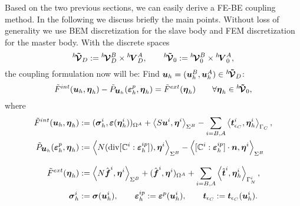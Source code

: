 \documentclass[12pt,a4paper]{scrbook}
\begin{document}
Based on the two previous sections, we can easily derive a  FE-BE coupling method. In the following we discuss briefly the main points. Without loss of generality we use BEM discretization for the slave body and FEM discretization for the master body. With the  discrete spaces
\[
{}^h\!\mbox{\boldmath$\tilde {\mathcal V}$}_D := {}^h\!\mbox{\boldmath$\mathcal V$}^{B}_D \times {}^h\!\mbox{\boldmath$V$}^{A}_D, \qquad {}^h\!\mbox{\boldmath$\tilde {\mathcal V}$}_0 := {}^h\!\mbox{\boldmath$\mathcal V$}^{B}_0 \times {}^h\!\mbox{\boldmath$V$}^{A}_0,
\]
the coupling formulation now will be: Find $\mbox{\boldmath$u$}_{h} = (\mbox{\boldmath$u$}^{B}_h,\mbox{\boldmath$u$}^{A}_h) \in {}^h\!\mbox{\boldmath$\tilde {\mathcal V}$}_D$:
\begin{equation}  \label{WeakFormF_FEMBEM}
\tilde F^{int}(\mbox{\boldmath$u$}_{h},\mbox{\boldmath$\eta$}_h) - \tilde P_{\mbox{\boldmath$u$}_{h}} ( \mbox{\boldmath$\varepsilon$}_{h}^p,\mbox{\boldmath$\eta$}_h) = \tilde F^{ext}(\mbox{\boldmath$\eta$}_h) \qquad \forall \mbox{\boldmath$\eta$}_h \in {}^h\!\mbox{\boldmath$\tilde {\mathcal V}$}_0,
\end{equation}
where
\begin{align*}
\tilde F^{int}(\mbox{\boldmath$u$}_{h},\mbox{\boldmath$\eta$}_h) &:= 
(\mbox{\boldmath$\sigma$}_{h}^i,\mbox{\boldmath$\varepsilon$}(\mbox{\boldmath$\eta$}^i_h))_{\Omega^{A}} 
+ \left\langle S \mbox{\boldmath$u$}^i, \mbox{\boldmath$\eta$}^i \right\rangle_{\Sigma^{B}} 
- \sum_{i=B,A} \left\langle \mbox{\boldmath$t$}_{\epsilon_C}^i, \mbox{\boldmath$\eta$}^i_h\right\rangle_{\Gamma_C}, \\
\tilde P_{\mbox{\boldmath$u$}_{h}} ( \mbox{\boldmath$\varepsilon$}_{h}^p,\mbox{\boldmath$\eta$}_h) &:= 
 \left\langle  N (\mathop{\rm div}\nolimits[{\mathbb C}^i : \mbox{\boldmath$\varepsilon$}_{h}^{ip}]), \mbox{\boldmath$\eta$}^i \right\rangle_{\Sigma^{B}}
- \left\langle [{\mathbb C}^i : \mbox{\boldmath$\varepsilon$}_{h}^{ip}] \cdot \mbox{\boldmath$n$}, \mbox{\boldmath$\eta$}^i\right\rangle_{\Sigma^{B}} \\[2ex]
\tilde F^{ext}(\mbox{\boldmath$\eta$}_h) &:= 
\left\langle N \hat{\mbox{\boldmath$f$}}^i, \mbox{\boldmath$\eta$}^i \right\rangle_{\Sigma^{B}}
+ ( \hat{\mbox{\boldmath$f$}}^i, \mbox{\boldmath$\eta$}^i)_{\Omega^{A}}
+ \sum_{i=B,A} \left\langle \hat{\mbox{\boldmath$t$}}^i, \mbox{\boldmath$\eta$}^i_h \right\rangle_{\Gamma^i_N}, \\
\mbox{\boldmath$\sigma$}^i_h &:= \mbox{\boldmath$\sigma$}(\mbox{\boldmath$u$}^i_h), \qquad \mbox{\boldmath$\varepsilon$}_{h}^{ip} := \mbox{\boldmath$\varepsilon$}^p(\mbox{\boldmath$u$}^i_h), \qquad \mbox{\boldmath$t$}_{\epsilon_C} := \mbox{\boldmath$t$}_{\epsilon_C}(\mbox{\boldmath$u$}^i_h).
\end{align*}
\end{document}
